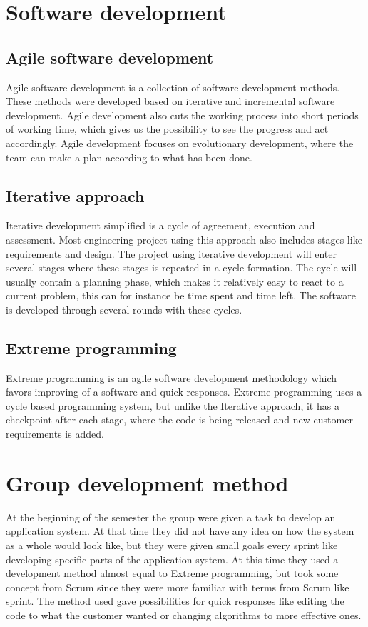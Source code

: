 \section{Software development}
\subsection{Agile software development}
Agile software development is a collection of software development methods. These methods were developed based on iterative and incremental software development. Agile development also cuts the working process into short periods of working time, which gives us the possibility to see the progress and act accordingly. Agile development focuses on evolutionary development, where the team can make a plan according to what has been done.  

\subsection{Iterative approach}
Iterative development simplified is a cycle of agreement, execution and assessment. Most engineering project using this approach also includes stages like requirements and design. The project using iterative development will enter several stages where these stages is repeated in a cycle formation. The cycle will usually contain a planning phase, which makes it relatively easy to react to a current problem, this can for instance be time spent and time left. The software is developed through several rounds with these cycles. 

\subsection{Extreme programming}
Extreme  programming is an agile software development methodology which favors improving of a software and quick responses. Extreme programming uses a cycle based programming system, but unlike the Iterative approach, it has a checkpoint after each stage, where the code is being released and new customer requirements is added.

\section{Group development method} 
At the beginning of the semester the group were given a task to develop an application system. At that time they did not have any idea on how the system as a whole would look like, but they were given small goals every sprint like developing specific parts of the application system. At this time they used a development method almost equal to Extreme programming, but took some concept from Scrum since they were more familiar with terms from Scrum like sprint. The method used gave possibilities for quick responses like editing the code to what the customer wanted or changing algorithms to more effective ones.

